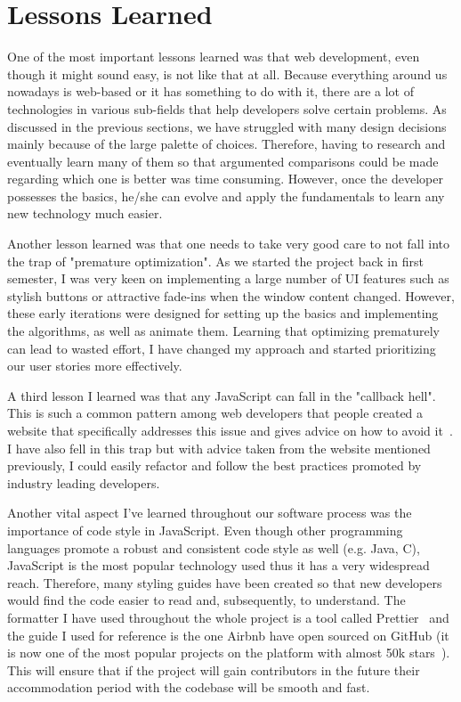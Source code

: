 \documentclass{l4proj}
\begin{document}
\section{Lessons Learned}

One of the most important lessons learned was that web development, even though it might sound easy, is not like that at all.
Because everything around us nowadays is web-based or it has something to do with it, there are a lot of technologies in
various sub-fields that help developers solve certain problems. As discussed in the previous sections, we have struggled
with many design decisions mainly because of the large palette of choices. Therefore, having to research and eventually
learn many of them so that argumented comparisons could be made regarding which one is better was time consuming.
However, once the developer possesses the basics, he/she can evolve and apply the fundamentals to learn any new
technology much easier.

Another lesson learned was that one needs to take very good care to not fall into the trap of "premature optimization".
As we started the project back in first semester, I was very keen on implementing a large number of UI features such as
stylish buttons or attractive fade-ins when the window content changed. However, these early iterations were designed
for setting up the basics and implementing the algorithms, as well as animate them. Learning that optimizing prematurely
can lead to wasted effort, I have changed my approach and started prioritizing our user stories more effectively.

A third lesson I learned was that any JavaScript can fall in the "callback hell". This is such a common pattern among
web developers that people created a website that specifically addresses this issue and gives advice on how to avoid
it~\cite{callback-hell}. I have also fell in this trap but with advice taken from the website mentioned previously, I
could easily refactor and follow the best practices promoted by industry leading developers.

Another vital aspect I've learned throughout our software process was the importance of code style in JavaScript. Even
though other programming languages promote a robust and consistent code style as well (e.g. Java, C), JavaScript is the
most popular technology used thus it has a very widespread reach. Therefore, many styling guides have been created so
that new developers would find the code easier to read and, subsequently, to understand. The formatter I have used throughout
the whole project is a tool called Prettier~\cite{prettier} and the guide I used for reference is the one Airbnb have
open sourced on GitHub (it is now one of the most popular projects on the platform with almost 50k
stars~\cite{airbnb-style-guide}). This will ensure that if the project will gain contributors in the future their
accommodation period with the codebase will be smooth and fast.
\end{document}
